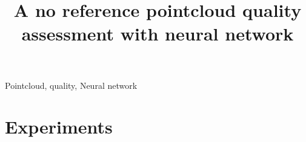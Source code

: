 \documentclass[lettersize,journal]{IEEEtran}
\begin{document}
\title{A no reference pointcloud quality assessment with neural network}

\author{}



\maketitle

\begin{abstract}

\end{abstract}

\begin{IEEEkeywords}
Pointcloud, quality, Neural network
\end{IEEEkeywords}









\section{Experiments}








\end{document}
